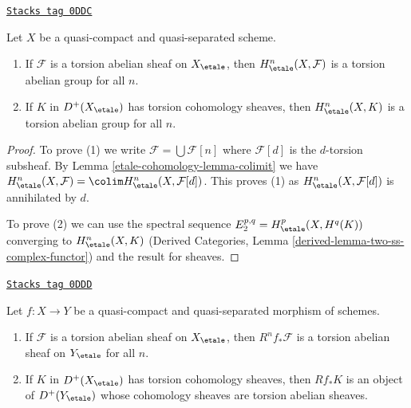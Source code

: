 \begin{lemma}
\label{etale-cohomology-lemma-torsion-cohomology}
\href{https://stacks.math.columbia.edu/tag/0DDC}{\texttt{Stacks tag 0DDC}}

Let $X$ be a quasi-compact and quasi-separated scheme.
\begin{enumerate}
\item If $\mathcal{F}$ is a torsion abelian sheaf on $X_\etale$, then
$H^n_\etale(X, \mathcal{F})$ is a torsion abelian group for all $n$.
\item If $K$ in $D^+(X_\etale)$ has torsion cohomology sheaves, then
$H^n_\etale(X, K)$ is a torsion abelian group for all $n$.
\end{enumerate}
\end{lemma}

\begin{proof}
To prove (1) we write $\mathcal{F} = \bigcup \mathcal{F}[n]$ where
$\mathcal{F}[d]$ is the $d$-torsion subsheaf. By
Lemma \ref{etale-cohomology-lemma-colimit} we have
$H^n_\etale(X, \mathcal{F}) = \colim H^n_\etale(X, \mathcal{F}[d])$.
This proves (1) as $H^n_\etale(X, \mathcal{F}[d])$ is annihilated by $d$.

\medskip\noindent
To prove (2) we can use the spectral sequence
$E_2^{p, q} = H^p_\etale(X, H^q(K))$ converging to $H^n_\etale(X, K)$
(Derived Categories, Lemma \ref{derived-lemma-two-ss-complex-functor})
and the result for sheaves.
\end{proof}

\begin{lemma}
\label{etale-cohomology-lemma-torsion-direct-image}
\href{https://stacks.math.columbia.edu/tag/0DDD}{\texttt{Stacks tag 0DDD}}

Let $f : X \to Y$ be a quasi-compact and quasi-separated
morphism of schemes.
\begin{enumerate}
\item If $\mathcal{F}$ is a torsion abelian sheaf on $X_\etale$, then
$R^nf_*\mathcal{F}$ is a torsion abelian sheaf on $Y_\etale$ for all $n$.
\item If $K$ in $D^+(X_\etale)$ has torsion cohomology sheaves, then
$Rf_*K$ is an object of $D^+(Y_\etale)$ whose cohomology sheaves are
torsion abelian sheaves.
\end{enumerate}
\end{lemma}

